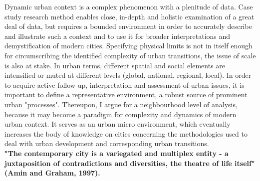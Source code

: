 \documentclass[11pt]{report}
\begin{document}
Dynamic urban context is a complex phenomenon with a plenitude of data. Case study research method enables close, in-depth and holistic examination of a great deal of data, but requires a bounded environment in order to accurately describe and illustrate such a context and to use it for broader interpretations and demystification of modern cities. Specifying physical limits is not in itself enough for circumscribing the identified complexity of urban transitions, the issue of scale is also at stake. In urban terms, different spatial and social elements are intensified or muted at different levels (global, national, regional, local). In order to acquire active follow-up, interpretation and assessment of urban issues, it is important to define a representative environment, a robust source of prominent urban "processes". Thereupon, I argue for a neighbourhood level of analysis, because it may become a paradigm for complexity and dynamics of modern urban context. It serves as an urban micro environment, which eventually increases the body of knowledge on cities concerning the methodologies used to deal with urban development and corresponding urban transitions.
\\
\textbf{"The contemporary city is a variegated and multiplex entity - a juxtaposition of contradictions and diversities, the theatre of life itself" (Amin and Graham, 1997).}
\end{document}
